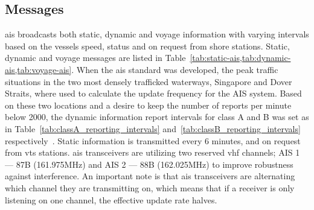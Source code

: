 \subsection{Messages}
\gls{ais} broadcasts both static, dynamic and voyage information with varying intervals based on the vessels speed, status and on request from shore stations. Static, dynamic and voyage messages are listed in Table~\cref{tab:static-ais,tab:dynamic-ais,tab:voyage-ais}. When the \gls{ais} standard was developed, the peak traffic situations in the two most densely trafficked waterways, Singapore and Dover Straits, where used to calculate the update frequency for the AIS system. Based on these two locations and a desire to keep the number of reports per minute below 2000, the dynamic information report intervals for class A and B was set as in Table~\ref{tab:classA_reporting_intervals} and~\ref{tab:classB_reporting_intervals} respectively~\cite{IALA2004}. Static information is transmitted every 6 minutes, and on request from \gls{vts} stations. \gls{ais} transceivers are utilizing two reserved \gls{vhf} channels; AIS 1 --- 87B (161.975MHz) and AIS 2 --- 88B (162.025MHz) to improve robustness against interference. An important note is that \gls{ais} transceivers are alternating which channel they are transmitting on, which means that if a receiver is only listening on one channel, the effective update rate halves.

